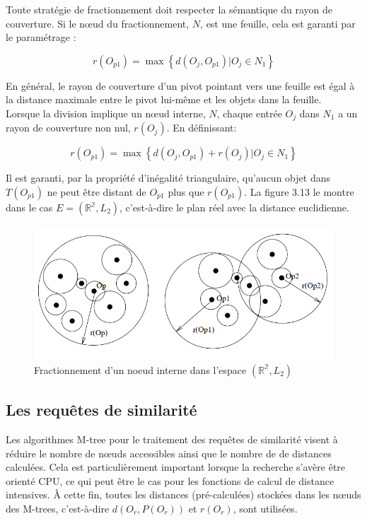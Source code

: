 Toute stratégie de fractionnement doit respecter la sémantique du rayon de couverture. Si le nœud du fractionnement, $ N $, est une feuille, cela est garanti par le paramétrage :

\begin{equation}
	r(O_{p1}) = \max \left\{d(O_j, O_{p1}) | O_j \in N_1 \right\}
\end{equation}

En général, le rayon de couverture d'un pivot pointant vers une feuille est égal à la distance maximale entre le pivot lui-même et les objets dans la feuille.\\

Lorsque la division implique un nœud interne, $ N $, chaque entrée $ O_j $ dans $ N_1 $ a un rayon de couverture non nul, $ r(O_j) $. En définissant:

\begin{equation}
r(O_{p1}) = \max \left\{d(O_j, O_{p1}) + r(O_j) | O_j \in N_1 \right\}
\end{equation}

Il est garanti, par la propriété d'inégalité triangulaire, qu'aucun objet dans $ T(O_{p1}) $ ne peut être distant de $  O_{p1} $ plus que $ r(O_{p1}) $. La figure 3.13 le montre dans le cas $ E = ( \mathbb{R^2}, L_2) $, c'est-à-dire le plan réel avec la distance euclidienne.
\begin{figure}[H]
	\centering
	\includegraphics[width=.6 \textwidth]{Figures/splitexep.png} %
	\caption{Fractionnement d'un noeud interne dans l'espace  $ ( \mathbb{R^2}, L_2) $}
\end{figure} 

\subsection{Les requêtes de similarité}
Les algorithmes M-tree pour le traitement des requêtes de similarité visent à réduire le nombre de nœuds accessibles ainsi que le nombre de  de distances calculées. Cela est particulièrement important lorsque la recherche s'avère être orienté CPU, ce qui peut être le cas pour les fonctions de calcul de distance intensives. À cette fin, toutes les distances (pré-calculées) stockées dans les nœuds des M-trees, c'est-à-dire $ d(O_r, P(O_r)) $ et $ r(O_r) $, sont utilisées.

